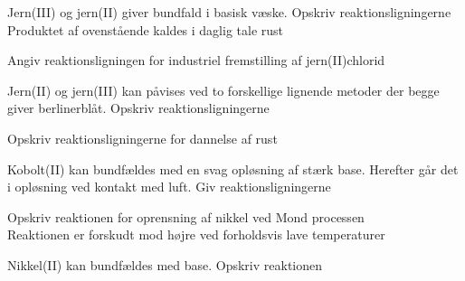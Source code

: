 \begin{flashcard}[Reaktion]{Jern(III) og jern(II) giver bundfald i basisk væske. Opskriv reaktionsligningerne}
\\
Produktet af ovenstående kaldes i daglig tale rust
\end{flashcard}

\begin{flashcard}[Fremstilling]{Angiv reaktionsligningen for industriel fremstilling af jern(II)chlorid}
\end{flashcard}

\begin{flashcard}[Reaktion]{Jern(II) og jern(III) kan påvises ved to forskellige lignende metoder der begge giver berlinerblåt. Opskriv reaktionsligningerne}
\\\vspace*{0.5cm}
\end{flashcard}

\begin{flashcard}[Reaktion]{Opskriv reaktionsligningerne for dannelse af rust}
\\\vspace*{0.5cm}
\end{flashcard}

\begin{flashcard}[Reaktion]{Kobolt(II) kan bundfældes med en svag opløsning af stærk base. Herefter går det i opløsning ved kontakt med luft. Giv reaktionsligningerne}
\\\vspace*{0.5cm}
\end{flashcard}

\begin{flashcard}[Fremstilling]{Opskriv reaktionen for oprensning af nikkel ved Mond processen}
\\\vspace*{0.5cm}
Reaktionen er forskudt mod højre ved forholdsvis lave temperaturer
\end{flashcard}

\begin{flashcard}[Egenskab]{Nikkel(II) kan bundfældes med base. Opskriv reaktionen}
\end{flashcard}

